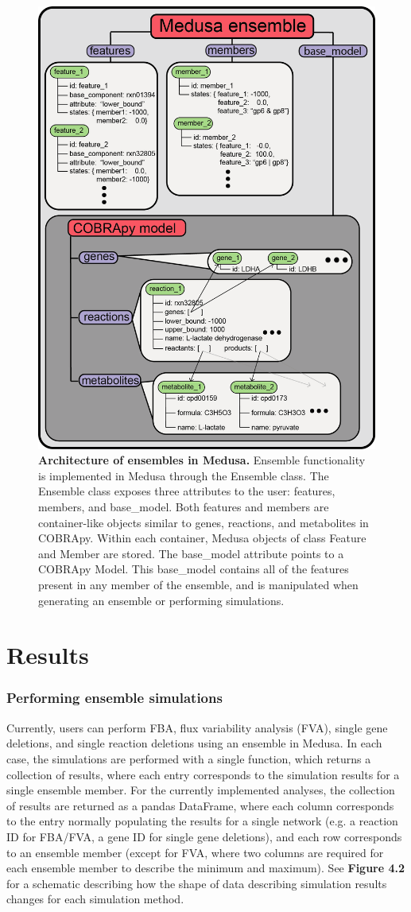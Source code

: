 \documentclass[11pt,onecolumn,notitlepage,openany,twoside]{book}
\begin{document}
\begin{refsection}
\begin{figure}[tb]
\centering
\includegraphics[width=0.5\linewidth]{ch4_fig1}
\caption[ Architecture of ensembles in Medusa.]{\textbf{ Architecture of ensembles in Medusa.} Ensemble functionality is implemented in Medusa through the Ensemble class. The Ensemble class exposes three attributes to the user: features, members, and base\_model. Both features and members are container-like objects similar to genes, reactions, and metabolites in COBRApy. Within each container, Medusa objects of class Feature and Member are stored. The base\_model attribute points to a COBRApy Model. This base\_model contains all of the features present in any member of the ensemble, and is manipulated when generating an ensemble or performing simulations.}
\end{figure}

\section{Results}
\subsubsection{Performing ensemble simulations}


Currently, users can perform FBA, flux variability analysis (FVA), single gene deletions, and single reaction deletions using an ensemble in Medusa. In each case, the simulations are performed with a single function, which returns a collection of results, where each entry corresponds to the simulation results for a single ensemble member. For the currently implemented analyses, the collection of results are returned as a pandas DataFrame, where each column corresponds to the entry normally populating the results for a single network (e.g. a reaction ID for FBA/FVA, a gene ID for single gene deletions), and each row corresponds to an ensemble member (except for FVA, where two columns are required for each ensemble member to describe the minimum and maximum). See \textbf{Figure 4.2} for a schematic describing how the shape of data describing simulation results changes for each simulation method.


\end{refsection}
\end{document}
